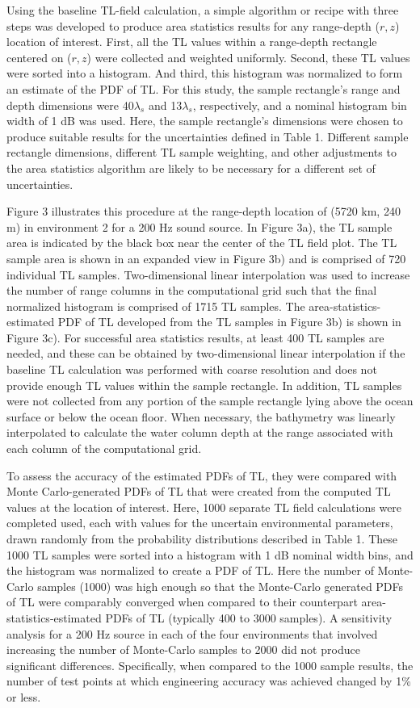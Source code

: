 Using the baseline TL-field calculation, a simple algorithm or recipe
with three steps was developed to produce area statistics results for
any range-depth ($r,z$) location of interest. First, all the TL values
within a range-depth rectangle centered on ($r,z$) were collected and
weighted uniformly. Second, these TL values were sorted into a
histogram.  And third, this histogram was normalized to form an
estimate of the PDF of TL. For this study, the sample rectangle's
range and depth dimensions were 40$\lambda_s$ and 13$\lambda_s$,
respectively, and a nominal histogram bin width of 1 dB was
used. Here, the sample rectangle's dimensions were chosen to produce
suitable results for the uncertainties defined in Table 1. Different
sample rectangle dimensions, different TL sample weighting, and other
adjustments to the area statistics algorithm are likely to be
necessary for a different set of uncertainties.

Figure 3 illustrates this procedure at the range-depth location of
(5720 km, 240 m) in environment 2 for a 200 Hz sound source. In
Figure 3a), the TL sample area is indicated by the black box near the
center of the TL field plot. The TL sample area is shown in an
expanded view in Figure 3b) and is comprised of 720 individual TL
samples.  Two-dimensional linear interpolation was used to increase
the number of range columns in the computational grid such that the
final normalized histogram is comprised of 1715 TL samples. The
area-statistics-estimated PDF of TL developed from the TL samples in
Figure 3b) is shown in Figure 3c). For successful area statistics results,
at least 400 TL samples are needed, and these can be obtained by
two-dimensional linear interpolation if the baseline TL calculation
was performed with coarse resolution and does not provide enough TL
values within the sample rectangle. In addition, TL samples were not
collected from any portion of the sample rectangle lying above the
ocean surface or below the ocean floor. When necessary, the bathymetry
was linearly interpolated to calculate the water column depth at the
range associated with each column of the computational grid.

To assess the accuracy of the estimated PDFs of TL, they were compared
with Monte Carlo-generated PDFs of TL that were created from the
computed TL values at the location of interest. Here, 1000 separate TL
field calculations were completed used, each with values for the
uncertain environmental parameters, drawn randomly from the
probability distributions described in Table 1. These 1000 TL samples
were sorted into a histogram with 1 dB nominal width bins, and the
histogram was normalized to create a PDF of TL. Here the number of
Monte-Carlo samples (1000) was high enough so that the Monte-Carlo
generated PDFs of TL were comparably converged when compared to their
counterpart area-statistics-estimated PDFs of TL (typically 400 to
3000 samples). A sensitivity analysis for a 200 Hz source in each of
the four environments that involved increasing the number of
Monte-Carlo samples to 2000 did not produce significant differences.
Specifically, when compared to the 1000 sample results, the number of
test points at which engineering accuracy was achieved changed by 1\%
or less.

